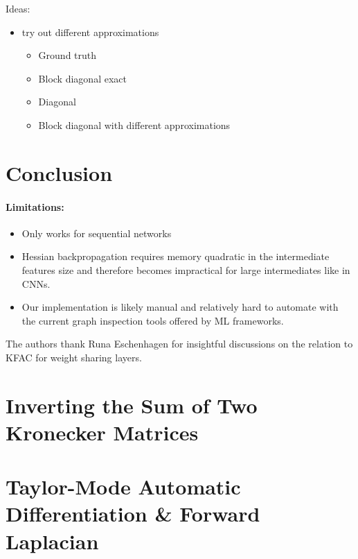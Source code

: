 \documentclass{article}
\begin{document}
Ideas:
\begin{itemize}
\item try out different approximations
  \begin{itemize}
  \item Ground truth
  \item Block diagonal exact
  \item Diagonal
  \item Block diagonal with different approximations
  \end{itemize}
\end{itemize}

\section{Conclusion}

\paragraph{Limitations:}
\begin{itemize}
\item Only works for sequential networks
\item Hessian backpropagation requires memory quadratic in the intermediate features size and therefore becomes impractical for large intermediates like in CNNs.
\item Our implementation is likely manual and relatively hard to automate with the current graph inspection tools offered by ML frameworks.
\end{itemize}

\begin{ack} %
  The authors thank Runa Eschenhagen for insightful discussions on the relation to KFAC for weight sharing layers.
\end{ack}




\clearpage
\appendix




\section{Inverting the Sum of Two Kronecker Matrices}


\section{Taylor-Mode Automatic Differentiation \& Forward Laplacian}

\end{document}

